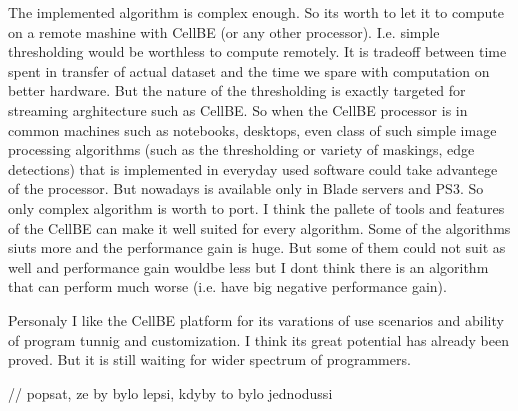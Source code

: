The implemented algorithm is complex enough. So its worth to let it to compute
on a remote mashine with CellBE (or any other processor). I.e.
simple thresholding would be worthless to compute remotely. It is tradeoff
between time spent in
transfer of actual dataset and the time we spare with computation on
better hardware. But the nature of the thresholding is exactly targeted for
streaming arghitecture such as CellBE. So when the CellBE processor is in common
machines such as notebooks, desktops, even class of such simple image processing
algorithms (such as the thresholding or variety of maskings, edge detections)
that is implemented in everyday used software could take advantege of the
processor. But nowadays is available only in Blade servers and PS3. So only
complex algorithm is worth to port. I think the pallete of tools and features
of the CellBE can make it well suited for every algorithm. Some of the
algorithms siuts more and the performance gain is huge. But some of them could
not suit as well and performance gain wouldbe less but I dont think there is an
algorithm that can perform much worse (i.e. have big negative performance gain).

Personaly I like the CellBE platform for its varations of use scenarios
and ability of program tunnig and customization. I think its great potential has
already been proved. But it is still waiting for wider spectrum of programmers.

// popsat, ze by bylo lepsi, kdyby to bylo jednodussi